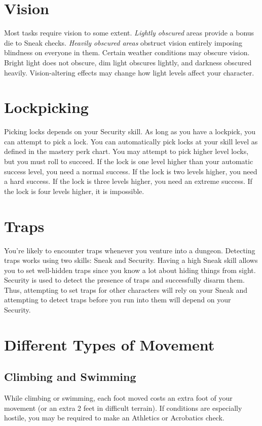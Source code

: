 \documentclass[12pt]{book}
\begin{document}
\section{Vision}
Most tasks require vision to some extent. \textit{Lightly obscured} areas provide a bonus die to Sneak checks. \textit{Heavily obscured areas} obstruct vision entirely imposing blindness on everyone in them. Certain weather conditions may obscure vision. Bright light does not obscure, dim light obscures lightly, and darkness obscured heavily. Vision-altering effects may change how light levels affect your character.

\section{Lockpicking}
Picking locks depends on your Security skill. As long as you have a lockpick, you can attempt to pick a lock. You can automatically pick locks at your skill level as defined in the mastery perk chart. You may attempt to pick higher level locks, but you must roll to succeed. If the lock is one level higher than your automatic success level, you need a normal success. If the lock is two levels higher, you need a hard success. If the lock is three levels higher, you need an extreme success. If the lock is four levels higher, it is impossible.

\section{Traps}
You're likely to encounter traps whenever you venture into a dungeon. Detecting traps works using two skills: Sneak and Security. Having a high Sneak skill allows you to set well-hidden traps since you know a lot about hiding things from sight. Security is used to detect the presence of traps and successfully disarm them. Thus, attempting to set traps for other characters will rely on your Sneak and attempting to detect traps before you run into them will depend on your Security.

\section{Different Types of Movement}

\subsection{Climbing and Swimming}
While climbing or swimming, each foot moved costs an extra foot of your movement (or an extra 2 feet in difficult terrain). If conditions are especially hostile, you may be required to make an Athletics or Acrobatics check.
\end{document}
